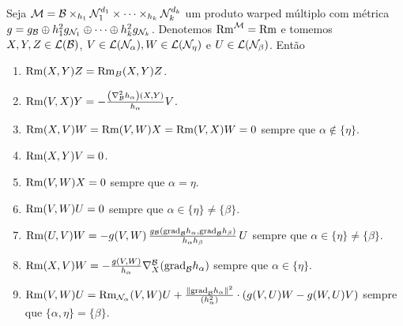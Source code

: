 \begin{lema}\label{RmDoWarped}
Seja $\mathcal{M} = \mathcal{B} \times_{h_1} \mathcal{N}_1^{d_1} \times \cdots \times_{h_k} \mathcal{N}_{k}^{d_k}$ um produto warped múltiplo com métrica $g = g_{\mathcal{B}} \oplus h_1^2 g_{\mathcal{N}_1} \oplus \cdots \oplus h_{k}^2 g_{\mathcal{N}_k}$. Denotemos $\mathrm{Rm}^{\mathcal{M}} = \mathrm{Rm}$ e tomemos $X, Y, Z \in \mathcal{L}(\mathcal{B})$, $V \in \mathcal{L}(\mathcal{N}_{\alpha}), W \in \mathcal{L}(\mathcal{N}_{\eta})$ e $U \in \mathcal{L}(\mathcal{N}_{\beta})$. Então
\begin{enumerate}[label=\color{blue}\normalfont\textbf{(\theenumi)}]
\item\label{1RmWarp} $\mathrm{Rm}(X, Y)Z = \mathrm{Rm}_B(X, Y)Z$.
\item\label{2RmWarp} $\mathrm{Rm}(V, X)Y = -\frac{\left(\nabla^2_{\mathcal{B}} h_{\alpha} \right)(X, Y)}{h_{\alpha}} V$.
\item\label{3RmWarp} $\mathrm{Rm}(X, V) W = \mathrm{Rm}(V, W)X = \mathrm{Rm}(V, X)W = 0$ sempre que $\alpha \notin \{ \eta \}$.
\item\label{4RmWarp} $\mathrm{Rm}(X, Y)V = 0$.
\item\label{5RmWarp} $\mathrm{Rm}(V, W)X = 0$ sempre que $\alpha = \eta$.
\item\label{6RmWarp} $\mathrm{Rm}(V, W)U = 0$ sempre que $\alpha \in \{\eta \} \neq \{\beta \}$.
\item\label{7RmWarp} $\mathrm{Rm}(U, V) W = -g(V, W) \, \frac{g_{\mathcal{B}}(\text{grad}_{\mathcal{B}} h_{\alpha}, \text{grad}_{\mathcal{B}} h_{\beta})}{h_{\alpha} h_{\beta}} \, U$ sempre que $\alpha \in \{ \eta \} \neq \{ \beta \}$. 
\item\label{sinalerrado} $\mathrm{Rm}(X, V)W = -\frac{g(V, W)}{h_{\alpha}} \nabla^{\mathcal{B}}_X(\text{grad}_{\mathcal{B}} h_{\alpha})$ sempre que $\alpha \in \{ \eta \}$.
\item\label{9doRmWarped} $\mathrm{Rm}(V, W)U = \mathrm{Rm}_{\mathcal{N}_{\alpha}}(V, W)U + \frac{\| \text{grad}_{\mathcal{B}} h_{\alpha} \|^2}{\left( h_{\alpha}^2 \right)} \cdot \left(g(V, U)W - g(W, U)V \right)$ sempre que $\{\alpha, \eta \}= \{\beta \}$.
\end{enumerate}
\end{lema}

